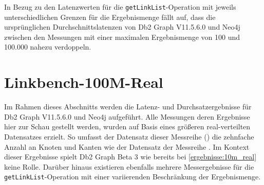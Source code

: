 \begin{table}[!h]
\centering
{}
\caption{Latenz Linkbench-10M-Real Neo4j GetLinkList}
\label{tab:latenz_10m_real:neo4j:gll}
\end{table}

In Bezug zu den Latenzwerten für die \texttt{getLinkList}-Operation mit jeweils unterschiedlichen Grenzen für die Ergebnismenge fällt auf, dass die ursprünglichen Durchschnittslatenzen von Db2 Graph V11.5.6.0 und Neo4j zwischen den Messungen mit einer maximalen Ergebnismenge von 100 und 100.000 nahezu verdoppeln.

\section{Linkbench-100M-Real}
\label{ergebnisse:100m_real}
Im Rahmen dieses Abschnitts werden die Latenz- und Durchsatzergebnisse für Db2 Graph V11.5.6.0 und Neo4j aufgeführt. Alle Messungen deren Ergebnisse hier zur Schau gestellt werden, wurden auf Basis eines größeren real-verteilten Datensatzes erzielt. So umfasst der Datensatz dieser Messreihe () die zehnfache Anzahl an Knoten und Kanten wie der Datensatz der Messreihe . Im Kontext dieser Ergebnisse spielt Db2 Graph Beta 3 wie bereits bei \autoref{ergebnisse:10m_real} keine Rolle. Darüber hinaus existieren  ebenfalls mehrere Messergebnisse für die \texttt{getLinkList}-Operation mit einer variierenden Beschränkung der Ergebnismenge.

